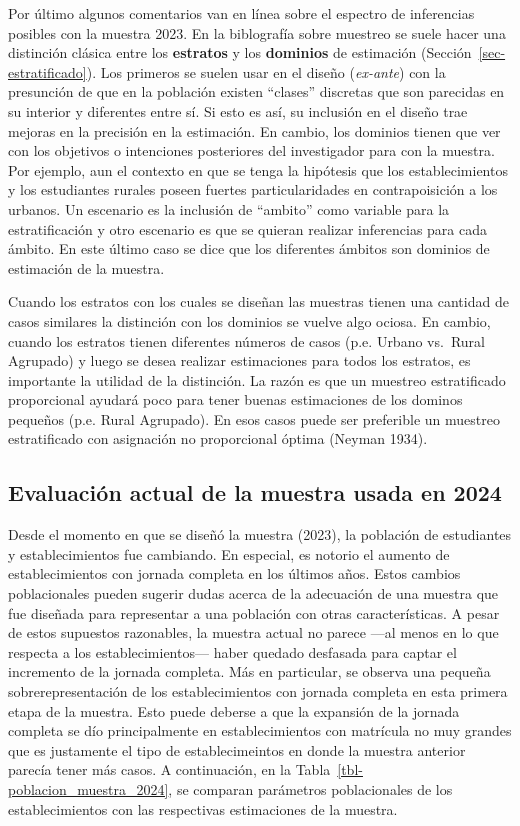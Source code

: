 \documentclass[
  spanish,
  a4paper,
]{scrreprt}
\begin{document}
Por último algunos comentarios van en línea sobre el espectro de
inferencias posibles con la muestra 2023. En la biblografía sobre
muestreo se suele hacer una distinción clásica entre los
\textbf{estratos} y los \textbf{dominios} de estimación
(Sección~\ref{sec-estratificado}). Los primeros se suelen usar en el
diseño (\emph{ex-ante}) con la presunción de que en la población existen
``clases'' discretas que son parecidas en su interior y diferentes entre
sí. Si esto es así, su inclusión en el diseño trae mejoras en la
precisión en la estimación. En cambio, los dominios tienen que ver con
los objetivos o intenciones posteriores del investigador para con la
muestra. Por ejemplo, aun el contexto en que se tenga la hipótesis que
los establecimientos y los estudiantes rurales poseen fuertes
particularidades en contrapoisición a los urbanos. Un escenario es la
inclusión de ``ambito'' como variable para la estratificación y otro
escenario es que se quieran realizar inferencias para cada ámbito. En
este último caso se dice que los diferentes ámbitos son dominios de
estimación de la muestra.

Cuando los estratos con los cuales se diseñan las muestras tienen una
cantidad de casos similares la distinción con los dominios se vuelve
algo ociosa. En cambio, cuando los estratos tienen diferentes números de
casos (p.e. Urbano vs.~Rural Agrupado) y luego se desea realizar
estimaciones para todos los estratos, es importante la utilidad de la
distinción. La razón es que un muestreo estratificado proporcional
ayudará poco para tener buenas estimaciones de los dominos pequeños
(p.e. Rural Agrupado). En esos casos puede ser preferible un muestreo
estratificado con asignación no proporcional óptima (Neyman 1934).

\subsection{Evaluación actual de la muestra usada en
2024}\label{evaluaciuxf3n-actual-de-la-muestra-usada-en-2024}

Desde el momento en que se diseñó la muestra (2023), la población de
estudiantes y establecimientos fue cambiando. En especial, es notorio el
aumento de establecimientos con jornada completa en los últimos años.
Estos cambios poblacionales pueden sugerir dudas acerca de la adecuación
de una muestra que fue diseñada para representar a una población con
otras características. A pesar de estos supuestos razonables, la muestra
actual no parece ---al menos en lo que respecta a los
establecimientos--- haber quedado desfasada para captar el incremento de
la jornada completa. Más en particular, se observa una pequeña
sobrerepresentación de los establecimientos con jornada completa en esta
primera etapa de la muestra. Esto puede deberse a que la expansión de la
jornada completa se dío principalmente en establecimientos con matrícula
no muy grandes que es justamente el tipo de establecimeintos en donde la
muestra anterior parecía tener más casos. A continuación, en la
Tabla~\ref{tbl-poblacion_muestra_2024}, se comparan parámetros
poblacionales de los establecimientos con las respectivas estimaciones
de la muestra.
\end{document}
